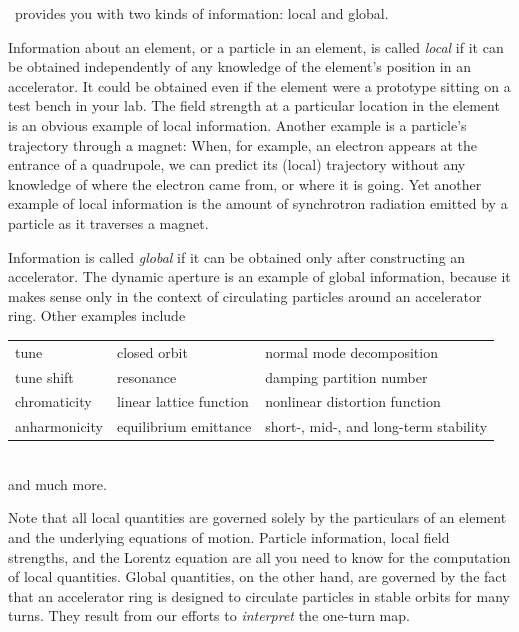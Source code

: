 %
\PTC\ provides you with two kinds of information: local and global.

%
Information about an element, or a particle in an element,
is called \emph{local} if it can be obtained independently of
any knowledge of the element's position in an accelerator.
It could be obtained even if the element were a prototype
sitting on a test bench in your lab. The field strength at
a particular location in the element is an obvious example
of local information. Another example is a particle's
trajectory through a magnet: When, for example, an electron
appears at the entrance of a quadrupole, we can predict its
(local) trajectory without any knowledge of where the electron
came from, or where it is going. Yet another example of local
information is the amount of synchrotron radiation emitted by
a particle as it traverses a magnet.

%
Information is called \emph{global} if it can be obtained
only after constructing an accelerator. The dynamic aperture
is an example of global information, because it makes sense
only in the context of circulating particles around an
accelerator ring. Other examples include\\
\begin{tabular}{lll}
  tune          & closed orbit            & normal mode decomposition \\
  tune shift    & resonance               & damping partition number \\
  chromaticity  & linear lattice function & nonlinear distortion
                                               function \\
  anharmonicity & equilibrium emittance   & short-, mid-, and
                                               long-term stability
\end{tabular}\\
\noindent and much more.

Note that all local quantities are governed solely by the
particulars of an element and the underlying equations of
motion. Particle information, local field strengths, and the
Lorentz equation are all you need to know for the computation
of local quantities. Global quantities, on the other hand,
are governed by the fact that an accelerator ring is designed
to circulate particles in stable orbits for many turns. They
result from our efforts to \emph{interpret} the one-turn map.


